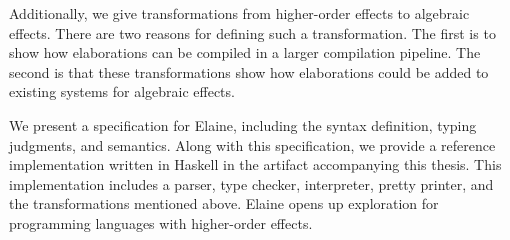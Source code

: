 Additionally, we give transformations from higher-order effects to algebraic effects. There are two reasons for defining such a transformation. The first is to show how elaborations can be compiled in a larger compilation pipeline. The second is that these transformations show how elaborations could be added to existing systems for algebraic effects.

We present a specification for Elaine, including the syntax definition, typing judgments, and semantics. Along with this specification, we provide a reference implementation written in Haskell in the artifact accompanying this thesis. This implementation includes a parser, type checker, interpreter, pretty printer, and the transformations mentioned above. Elaine opens up exploration for programming languages with higher-order effects.


